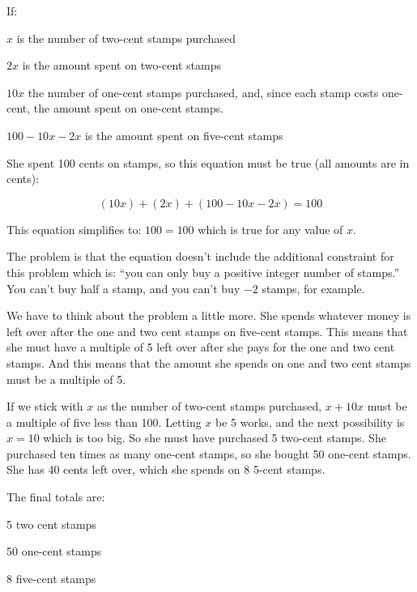 \documentclass[letterpaper]{exam}
\begin{document}
  \begin{solution}

    If:
    \begin{itemize*}
      \item $x$ is the number of two-cent stamps purchased
      \item $2x$ is the amount spent on two-cent stamps
      \item $10x$ the number of one-cent stamps purchased, and, since each
        stamp costs one-cent, the amount spent on one-cent stamps.
      \item $100 - 10x - 2x$ is the amount spent on five-cent stamps
    \end{itemize*}

    She spent 100 cents on stamps, so this equation must be true (all amounts
    are in cents):

    \[
      (10x) + (2x) + (100 - 10x - 2x) = 100 
    \]

    This equation simplifies to: $100 = 100$ which is true for any value of $x$.  

    The problem is that the equation doesn't include the additional constraint
    for this problem which is: ``you can only buy a positive integer number of
    stamps.''  You can't buy half a stamp, and you can't buy $-2$ stamps, for
    example.

    We have to think about the problem a little more.  She spends whatever
    money is left over after the one and two cent stamps on five-cent stamps.
    This means that she must have a multiple of 5 left over after she pays for
    the one and two cent stamps.  And this means that the amount she spends on
    one and two cent stamps must be a multiple of 5.  

    If we stick with $x$ as the number of two-cent stamps purchased, $x + 10x$
    must be a multiple of five less than 100.  Letting $x$ be 5 works, and the
    next possibility is $x=10$ which is too big.  So she must have purchased 5
    two-cent stamps.  She purchased ten times as many one-cent stamps, so she
    bought 50 one-cent stamps.  She has 40 cents left over, which she spends on
    8 5-cent stamps.  
    
    The final totals are:
    \begin{itemize*}
      \item 5 two cent stamps
      \item 50 one-cent stamps
      \item 8 five-cent stamps
    \end{itemize*}

  \end{solution}
\end{document}
